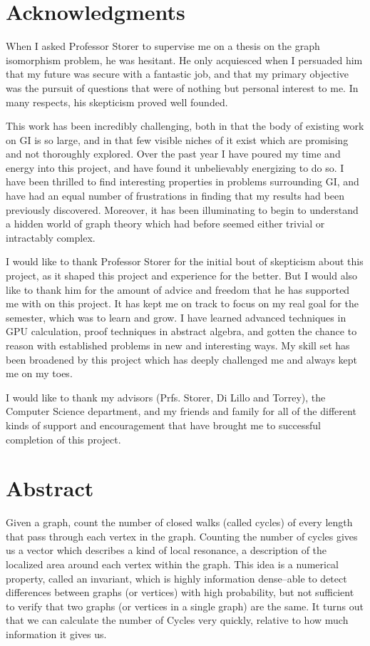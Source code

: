 \chapter*{Acknowledgments}

When I asked Professor Storer to supervise me on a thesis on the graph isomorphism problem, he was hesitant.
He only acquiesced when I persuaded him that my future was secure with a fantastic job, and that my primary objective was the pursuit of questions that were of nothing but personal interest to me.
In many respects, his skepticism proved well founded.

This work has been incredibly challenging, both in that the body of existing work on GI is so large, and in that few visible niches of it exist which are promising and not thoroughly explored.
Over the past year I have poured my time and energy into this project, and have found it unbelievably energizing to do so.
I have been thrilled to find interesting properties in problems surrounding GI, and have had an equal number of frustrations in finding that my results had been previously discovered.
Moreover, it has been illuminating to begin to understand a hidden world of graph theory which had before seemed either trivial or intractably complex.

I would like to thank Professor Storer for the initial bout of skepticism about this project, as it shaped this project and experience for the better.
But I would also like to thank him for the amount of advice and freedom that he has supported me with on this project.
It has kept me on track to focus on my real goal for the semester, which was to learn and grow.
I have learned advanced techniques in GPU calculation, proof techniques in abstract algebra, and gotten the chance to reason with established problems in new and interesting ways.
My skill set has been broadened by this project which has deeply challenged me and always kept me on my toes.

I would like to thank my advisors (Prfs. Storer, Di Lillo and Torrey), the Computer Science department, and my friends and family for all of the different kinds of support and encouragement that have brought me to successful completion of this project.

\chapter*{Abstract}

Given a graph, count the number of closed walks (called cycles) of every length that pass through each vertex in the graph.
Counting the number of cycles gives us a vector which describes a kind of local resonance, a description of the localized area around each vertex within the graph.
This idea is a numerical property, called an invariant, which is highly information dense--able to detect differences between graphs (or vertices) with high probability, but not sufficient to verify that two graphs (or vertices in a single graph) are the same.
It turns out that we can calculate the number of Cycles very quickly, relative to how much information it gives us.

